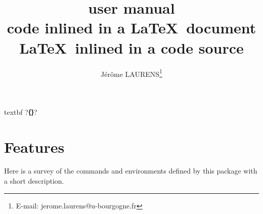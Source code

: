 \documentclass{article}
\begin{document}
\begin{CDRBlockSave}{textbf}
?\textbf{⟨⟩}?
\end{CDRBlockSave}
\title{ user manual\\
code inlined in a \LaTeX\ document\\
\LaTeX\ inlined in a code source
}
\author{Jérôme LAURENS\thanks{E-mail: jerome.laurens@u-bourgogne.fr}}
\maketitle
\tableofcontents
%
%
\section{Features}
Here is a survey of the commands and environments defined by this package with a short description.
\end{document}
